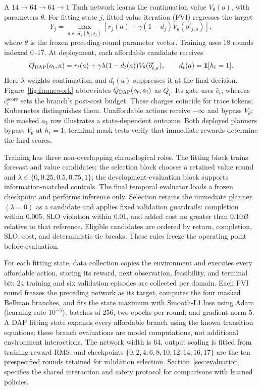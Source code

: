 \documentclass[acmsmall,screen,review,anonymous]{acmart}
\newcommand{\method}{\textsc{DAP}\xspace}
\begin{document}
A \(14\!\rightarrow\!64\!\rightarrow\!64\!\rightarrow\!1\) Tanh network learns
the continuation value \(V_\theta(o)\), with parameters \(\theta\).
For fitting state \(j\), fitted value iteration (FVI) regresses the target
\begin{equation}
  Y_j=\max_{a\in\mathcal A_j(b_j,s_j)}
  \left[r_j(a)+\gamma(1-d_j)V_{\bar\theta}(o'_{j,a})\right],
\end{equation}
where \(\bar\theta\) is the frozen preceding-round parameter vector.
Training uses 18 rounds indexed 0--17. At deployment, each affordable
candidate receives
\begin{equation}
  Q_{\method}(o_t,a)=r_t(a)+\gamma\lambda
  (1-d_t(a))V_\theta(\widehat o'_{t,a}),
  \qquad d_t(a)=\mathbf 1[h_t=1].
\end{equation}
Here \(\lambda\) weights continuation, and \(d_t(a)\) suppresses it at
the final decision. Figure~\ref{fig:framework} abbreviates
\(Q_\method(o_t,a_i)\) as \(Q_i\). Its gate uses \(\bar c_t\),
whereas \(c_t^{\mathrm{score}}\) sets the branch's post-cost budget.
These charges coincide for trace tokens; Kubernetes distinguishes them.
Unaffordable actions receive \(-\infty\) and bypass \(V_\theta\);
the masked \(a_3\) row illustrates a state-dependent outcome. Both deployed
planners bypass \(V_\theta\) at \(h_t=1\); terminal-mask tests verify that
immediate rewards determine the final scores.

Training has three non-overlapping chronological roles.  The fitting block
trains forecast and value candidates; the selection block chooses a retained
value round and \(\lambda\in\{0,0.25,0.5,0.75,1\}\); the development-evaluation
block supports information-matched controls.  The final temporal evaluator
loads a frozen checkpoint and performs inference only.  Selection retains the
immediate planner \((\lambda=0)\) as a candidate and applies fixed validation
guardrails: completion within 0.005, SLO violation within 0.01, and added cost
no greater than \(0.10B\) relative to that reference.  Eligible candidates are
ordered by return, completion, SLO, cost, and deterministic tie breaks.  These
rules freeze the operating point before evaluation.

For each fitting state, data collection copies the environment and executes
every affordable action, storing its reward, next observation, feasibility,
and terminal bit; 24 training and six validation episodes are collected per
domain.  Each FVI round freezes the preceding network as its target, computes
the four masked Bellman branches, and fits the state maximum with Smooth-L1
loss using Adam (learning rate \(10^{-3}\)), batches of 256, two epochs per
round, and gradient norm 5.  A DAP fitting state expands every affordable
branch using the known transition equations; these branch evaluations are
model computations, not additional environment interactions.  The network
width is 64, output scaling is fitted from training-reward RMS, and checkpoints
\(\{0,2,4,6,8,10,12,14,16,17\}\) are the ten prespecified rounds retained for
validation selection. Section~\ref{sec:evaluation} specifies the shared
interaction and safety protocol for comparisons with learned policies.
\end{document}
